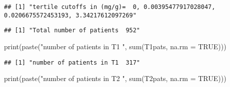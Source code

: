 \documentclass[
]{article}
\newenvironment{Shaded}{\begin{snugshade}}{\end{snugshade}}
\newcommand{\AttributeTok}[1]{\textcolor[rgb]{0.77,0.63,0.00}{#1}}
\newcommand{\ConstantTok}[1]{\textcolor[rgb]{0.00,0.00,0.00}{#1}}
\newcommand{\DecValTok}[1]{\textcolor[rgb]{0.00,0.00,0.81}{#1}}
\newcommand{\FunctionTok}[1]{\textcolor[rgb]{0.00,0.00,0.00}{#1}}
\newcommand{\NormalTok}[1]{#1}
\newcommand{\OtherTok}[1]{\textcolor[rgb]{0.56,0.35,0.01}{#1}}
\newcommand{\SpecialCharTok}[1]{\textcolor[rgb]{0.00,0.00,0.00}{#1}}
\newcommand{\StringTok}[1]{\textcolor[rgb]{0.31,0.60,0.02}{#1}}
\begin{document}
\begin{verbatim}
## [1] "tertile cutoffs in (mg/g)=  0, 0.00395477917028047, 0.0206675572453193, 3.34217612097269"
\end{verbatim}

\begin{Shaded}
\end{Shaded}

\begin{verbatim}
## [1] "Total number of patients  952"
\end{verbatim}

\begin{Shaded}
\begin{Highlighting}[]
\FunctionTok{print}\NormalTok{(}\FunctionTok{paste}\NormalTok{(}\StringTok{"number of patients in T1 "}\NormalTok{, }\FunctionTok{sum}\NormalTok{(T1pats, }\AttributeTok{na.rm =} \ConstantTok{TRUE}\NormalTok{)))}
\end{Highlighting}
\end{Shaded}

\begin{verbatim}
## [1] "number of patients in T1  317"
\end{verbatim}

\begin{Shaded}
\begin{Highlighting}[]
\FunctionTok{print}\NormalTok{(}\FunctionTok{paste}\NormalTok{(}\StringTok{"number of patients in T2 "}\NormalTok{, }\FunctionTok{sum}\NormalTok{(T2pats, }\AttributeTok{na.rm =} \ConstantTok{TRUE}\NormalTok{)))}
\end{Highlighting}
\end{Shaded}
\end{document}
